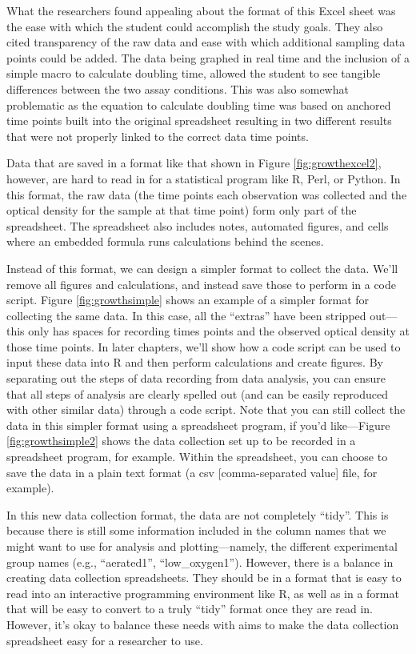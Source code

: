 \documentclass[]{tufte-book}
\begin{document}
What the researchers found appealing about the format of this Excel sheet was
the ease with which the student could accomplish the study goals. They also
cited transparency of the raw data and ease with which additional sampling data
points could be added. The data being graphed in real time and the inclusion of
a simple macro to calculate doubling time, allowed the student to see tangible
differences between the two assay conditions. This was also somewhat problematic
as the equation to calculate doubling time was based on anchored time points
built into the original spreadsheet resulting in two different results that were
not properly linked to the correct data time points.

Data that are saved in a format like that shown in Figure \ref{fig:growthexcel2},
however, are hard to read in for a statistical program like R, Perl, or Python.
In this format, the raw data (the time points each observation was collected and
the optical density for the sample at that time point) form only part of the
spreadsheet. The spreadsheet also includes notes, automated figures, and
cells where an embedded formula runs calculations behind the scenes.

Instead of this format, we can design a simpler format to collect the data. We'll
remove all figures and calculations, and instead save those to perform in a
code script. Figure \ref{fig:growthsimple} shows an example of a simpler
format for collecting the same data. In this case, all the ``extras'' have been
stripped out---this only has spaces for recording times points and the observed
optical density at those time points. In later chapters, we'll show how a code
script can be used to input these data into R and then perform calculations
and create figures. By separating out the steps of data recording from
data analysis, you can ensure that all steps of analysis are clearly spelled
out (and can be easily reproduced with other similar data) through a code
script. Note that you can still collect the data in this simpler format using
a spreadsheet program, if you'd like---Figure \ref{fig:growthsimple2} shows
the data collection set up to be recorded in a spreadsheet program, for example.
Within the spreadsheet, you can choose to save the data in a plain text format
(a csv {[}comma-separated value{]} file, for example).

In this new data collection format, the data are not completely ``tidy''. This is because
there is still some information included in the column names that we might want to use
for analysis and plotting---namely, the different experimental group names (e.g.,
``aerated1'', ``low\_oxygen1''). However, there is a balance in creating data collection
spreadsheets. They should be in a format that is easy to read into an interactive
programming environment like R, as well as in a format that will be easy to convert
to a truly ``tidy'' format once they are read in. However, it's okay to balance these
needs with aims to make the data collection spreadsheet easy for a researcher to use.
\end{document}
